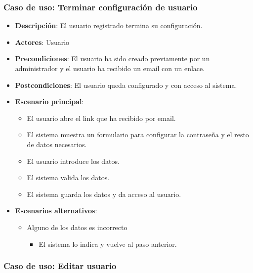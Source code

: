 \documentclass[12pt,a4paperpaper,]{report}
\providecommand{\tightlist}{%
  \setlength{\itemsep}{0pt}\setlength{\parskip}{0pt}}
\begin{document}
\subsubsection{Caso de uso: Terminar configuración de
usuario}\label{caso-de-uso-terminar-configuraciuxf3n-de-usuario}

\begin{itemize}
\tightlist
\item
  \textbf{Descripción}: El usuario registrado termina su configuración.
\item
  \textbf{Actores}: Usuario
\item
  \textbf{Precondiciones}: El usuario ha sido creado previamente por un
  administrador y el usuario ha recibido un email con un enlace.
\item
  \textbf{Postcondiciones}: El usuario queda configurado y con acceso al
  sistema.
\item
  \textbf{Escenario principal}:

  \begin{itemize}
  \tightlist
  \item
    El usuario abre el link que ha recibido por email.
  \item
    El sistema muestra un formulario para configurar la contraseña y el
    resto de datos necesarios.
  \item
    El usuario introduce los datos.
  \item
    El sistema valida los datos.
  \item
    El sistema guarda los datos y da acceso al usuario.
  \end{itemize}
\item
  \textbf{Escenarios alternativos}:

  \begin{itemize}
  \tightlist
  \item
    Alguno de los datos es incorrecto

    \begin{itemize}
    \tightlist
    \item
      El sistema lo indica y vuelve al paso anterior.
    \end{itemize}
  \end{itemize}
\end{itemize}

\subsubsection{Caso de uso: Editar
usuario}\label{caso-de-uso-editar-usuario}
\end{document}

